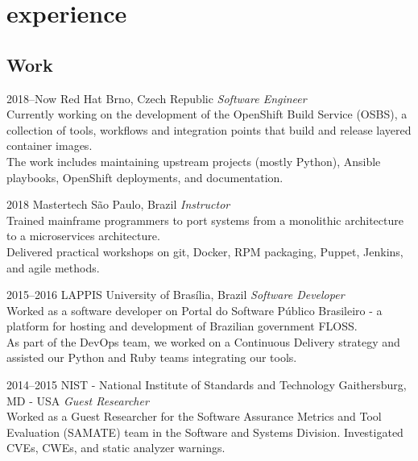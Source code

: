 \documentclass[print]{friggeri-cv}
\begin{document}

\section{experience}

\subsection{Work}

\begin{entrylist}

\entry
{2018--Now}
{Red Hat}
{Brno, Czech Republic}
{\emph{Software Engineer} \\
  Currently working on the development of the OpenShift Build Service (OSBS), a
  collection of tools, workflows and integration points that build and release
  layered container images. \\
  The work includes maintaining upstream projects (mostly Python), Ansible
  playbooks, OpenShift deployments, and documentation.
}

\entry
{2018}
{Mastertech}
{São Paulo, Brazil}
{\emph{Instructor} \\
  Trained mainframe programmers to port systems from a monolithic
  architecture to a microservices architecture. \\
  Delivered practical workshops on git, Docker, RPM packaging, Puppet, Jenkins,
  and agile methods.
}

\entry
{2015--2016}
{LAPPIS}
{University of Brasília, Brazil}
{\emph{Software Developer} \\
  Worked as a software developer on Portal do Software Público
  Brasileiro - a platform for hosting and development of Brazilian government
  FLOSS. \\
  As part of the DevOps team, we worked on a Continuous Delivery strategy and
  assisted our Python and Ruby teams integrating our tools.
  }



\entry
{2014--2015}
{NIST - National Institute of Standards and Technology}
{Gaithersburg, MD - USA}
{\emph{Guest Researcher} \\
  Worked as a Guest Researcher for the Software Assurance Metrics and Tool
  Evaluation (SAMATE) team in the Software and Systems Division. Investigated
  CVEs, CWEs, and static analyzer warnings.
  }

\end{entrylist}
\end{document}
